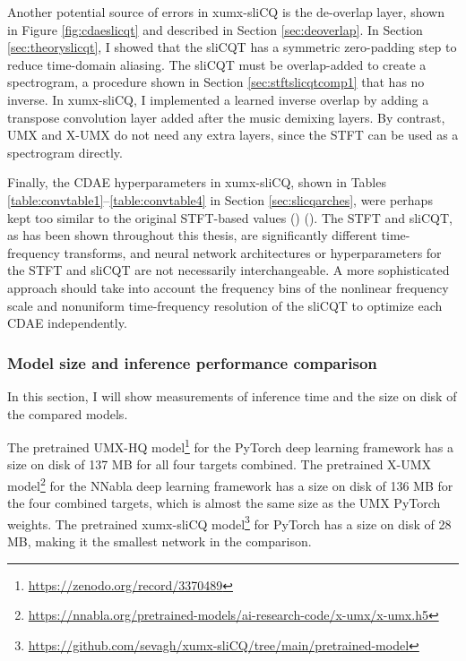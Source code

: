 \documentclass[report.tex]{subfiles}
\begin{document}
Another potential source of errors in xumx-sliCQ is the de-overlap layer, shown in Figure \ref{fig:cdaeslicqt} and described in Section \ref{sec:deoverlap}. In Section \ref{sec:theoryslicqt}, I showed that the sliCQT has a symmetric zero-padding step to reduce time-domain aliasing. The sliCQT must be overlap-added to create a spectrogram, a procedure shown in Section \ref{sec:stftslicqtcomp1} that has no inverse. In xumx-sliCQ, I implemented a learned inverse overlap by adding a transpose convolution layer added after the music demixing layers. By contrast, UMX and X-UMX do not need any extra layers, since the STFT can be used as a spectrogram directly.

Finally, the CDAE hyperparameters in xumx-sliCQ, shown in Tables \ref{table:convtable1}--\ref{table:convtable4} in Section \ref{sec:slicqarches}, were perhaps kept too similar to the original STFT-based values (\cite[3]{plumbley1}) (\cite[3]{plumbley2}). The STFT and sliCQT, as has been shown throughout this thesis, are significantly different time-frequency transforms, and neural network architectures or hyperparameters for the STFT and sliCQT are not necessarily interchangeable. A more sophisticated approach should take into account the frequency bins of the nonlinear frequency scale and nonuniform time-frequency resolution of the sliCQT to optimize each CDAE independently.

\newpagefill

\subsubsection{Model size and inference performance comparison}
\label{sec:inferenceperf}

In this section, I will show measurements of inference time and the size on disk of the compared models.

The pretrained UMX-HQ model\footnote{\url{https://zenodo.org/record/3370489}} for the PyTorch deep learning framework has a size on disk of 137 MB for all four targets combined. The pretrained X-UMX model\footnote{\url{https://nnabla.org/pretrained-models/ai-research-code/x-umx/x-umx.h5}} for the NNabla deep learning framework has a size on disk of 136 MB for the four combined targets, which is almost the same size as the UMX PyTorch weights. The pretrained xumx-sliCQ model\footnote{\url{https://github.com/sevagh/xumx-sliCQ/tree/main/pretrained-model}} for PyTorch has a size on disk of 28 MB, making it the smallest network in the comparison.
\end{document}

